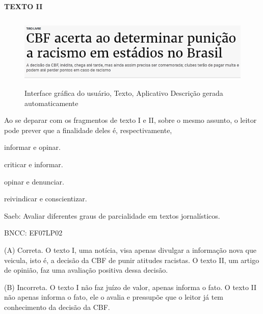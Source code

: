 
\textbf{TEXTO II}

\begin{figure}
\centering
\includegraphics[width=5.47847in,height=1.37348in]{./imgSAEB_8_POR/media/image34.png}
\caption{Interface gráfica do usuário, Texto, Aplicativo Descrição
gerada automaticamente}
\end{figure}


Ao se deparar com os fragmentos de texto I e II, sobre o mesmo assunto,
o leitor pode prever que a finalidade deles é, respectivamente,

\begin{escolha}
\item informar e opinar.

\item criticar e informar.

\item opinar e denunciar.

\item reivindicar e conscientizar.
\end{escolha}

Saeb: Avaliar diferentes graus de parcialidade em textos jornalísticos.

BNCC: EF07LP02

(A) Correta. O texto I, uma notícia, visa apenas divulgar a informação
nova que veicula, isto é, a decisão da CBF de punir atitudes racistas. O
texto II, um artigo de opinião, faz uma avaliação positiva dessa
decisão.

(B) Incorreta. O texto I não faz juízo de valor, apenas informa o fato.
O texto II não apenas informa o fato, ele o avalia e pressupõe que o
leitor já tem conhecimento da decisão da CBF.

